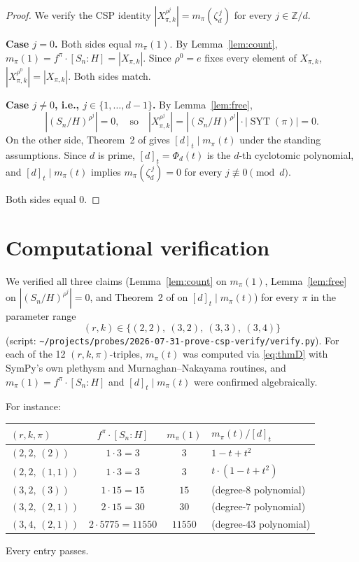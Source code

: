 \documentclass[11pt]{article}
\theoremstyle{definition}
\theoremstyle{remark}
\newcommand{\SYT}{\operatorname{SYT}}
\newcommand{\ZZ}{\mathbb{Z}}
\begin{document}
\begin{proof}
We verify the CSP identity $|X_{\pi,k}^{\rho^j}| = m_\pi(\zeta_d^{\,j})$ for every $j \in \ZZ/d$.

\smallskip\noindent
\textbf{Case $j = 0$.}  Both sides equal $m_\pi(1)$.  By Lemma~\ref{lem:count}, $m_\pi(1) = f^\pi \cdot [S_n : H] = |X_{\pi,k}|$.  Since $\rho^0 = e$ fixes every element of $X_{\pi,k}$, $|X_{\pi,k}^{\rho^0}| = |X_{\pi,k}|$.  Both sides match.

\smallskip\noindent
\textbf{Case $j \ne 0$, i.e., $j \in \{1, \ldots, d-1\}$.}  By Lemma~\ref{lem:free},
\[
|(S_n/H)^{\rho^j}| = 0, \quad \text{so} \quad |X_{\pi,k}^{\rho^j}| = |(S_n/H)^{\rho^j}| \cdot |\SYT(\pi)| = 0.
\]
On the other side, Theorem~2 of \cite{Wreath-general-r} gives $[d]_t \mid m_\pi(t)$ under the standing assumptions.  Since $d$ is prime, $[d]_t = \Phi_d(t)$ is the $d$-th cyclotomic polynomial, and $[d]_t \mid m_\pi(t)$ implies $m_\pi(\zeta_d^{\,j}) = 0$ for every $j \not\equiv 0 \pmod d$.

Both sides equal $0$.
\end{proof}

\section{Computational verification}

We verified all three claims (Lemma~\ref{lem:count} on $m_\pi(1)$, Lemma~\ref{lem:free} on $|(S_n/H)^{\rho^j}| = 0$, and Theorem~2 of \cite{Wreath-general-r} on $[d]_t \mid m_\pi(t)$) for every $\pi$ in the parameter range
\[
(r, k) \in \bigl\{(2,2),\ (3,2),\ (3,3),\ (3,4)\bigr\}
\]
(script: \verb|~/projects/probes/2026-07-31-prove-csp-verify/verify.py|).  For each of the 12 $(r,k,\pi)$-triples, $m_\pi(t)$ was computed via \eqref{eq:thmD} with SymPy's own plethysm and Murnaghan--Nakayama routines, and $m_\pi(1) = f^\pi \cdot [S_n : H]$ and $[d]_t \mid m_\pi(t)$ were confirmed algebraically.

For instance:
\begin{center}
\begin{tabular}{lccl}
$(r,k,\pi)$ & $f^\pi \cdot [S_n:H]$ & $m_\pi(1)$ & $m_\pi(t) / [d]_t$ \\\hline
$(2,2,\, (2))$ & $1 \cdot 3 = 3$ & $3$ & $1 - t + t^2$ \\
$(2,2,\, (1,1))$ & $1 \cdot 3 = 3$ & $3$ & $t \cdot (1 - t + t^2)$ \\
$(3,2,\, (3))$ & $1 \cdot 15 = 15$ & $15$ & (degree-$8$ polynomial) \\
$(3,2,\, (2,1))$ & $2 \cdot 15 = 30$ & $30$ & (degree-$7$ polynomial) \\
$(3,4,\, (2,1))$ & $2 \cdot 5775 = 11550$ & $11550$ & (degree-$43$ polynomial) \\
\end{tabular}
\end{center}
Every entry passes.
\end{document}
